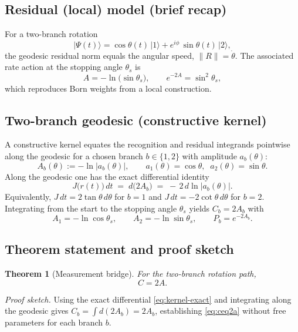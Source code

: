 \documentclass[reprint,aps,prd,nofootinbib]{revtex4-2}
\newtheorem{theorem}{Theorem}
\begin{document}
\subsection{Residual (local) model (brief recap)}
For a two-branch rotation
\begin{equation}
  |\Psi(t)\rangle=\cos\theta(t)\,|1\rangle + e^{i\phi}\,\sin\theta(t)\,|2\rangle,\label{eq:rotation}
\end{equation}
the geodesic residual norm equals the angular speed, $\lVert R\rVert=\dot{\theta}$. The associated rate action at the stopping angle $\theta_s$ is
\begin{equation}
  A= -\ln\big(\sin\theta_s\big),\qquad e^{-2A}=\sin^2\!\theta_s,\label{eq:Adef}
\end{equation}
which reproduces Born weights from a local construction.

\subsection{Two-branch geodesic (constructive kernel)}
A constructive kernel equates the recognition and residual integrands pointwise along the geodesic for a chosen branch $b\in\{1,2\}$ with amplitude $a_b(\theta)$:
\[
  A_b(\theta) := -\ln|a_b(\theta)|, \qquad
  a_1(\theta)=\cos\theta,\;\; a_2(\theta)=\sin\theta.
\]
Along the geodesic one has the exact differential identity
\begin{equation}
  J\big(r(t)\big)\,dt \;=\; d\!\big(2A_b\big) \;=\; -\,2\,d\ln|a_b(\theta)|. \label{eq:kernel-exact}
\end{equation}
Equivalently, $J\,dt=2\tan\theta\,d\theta$ for $b=1$ and $J\,dt=-2\cot\theta\,d\theta$ for $b=2$.
Integrating from the start to the stopping angle $\theta_s$ yields $C_b=2A_b$ with
\begin{equation}
  A_1=-\ln\cos\theta_s,\qquad A_2=-\ln\sin\theta_s,\qquad P_b=e^{-2A_b}. \label{eq:branch-actions}
\end{equation}

\subsection{Theorem statement and proof sketch}
\begin{theorem}[Measurement bridge]\label{thm:ceq2a}
For the two-branch rotation path,
\begin{equation}\label{eq:ceq2a}
  C = 2A.
\end{equation}
\end{theorem}
\noindent\emph{Proof sketch.} Using the exact differential \eqref{eq:kernel-exact} and integrating along the geodesic gives $C_b=\int d(2A_b)=2A_b$, establishing \eqref{eq:ceq2a} without free parameters for each branch $b$. 
\end{document}
